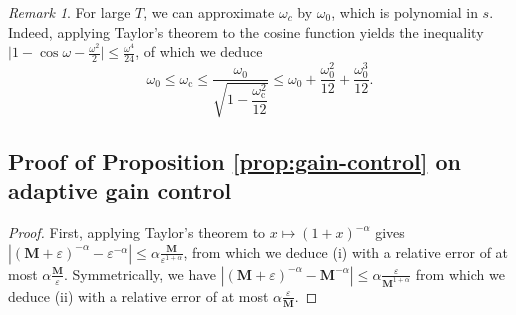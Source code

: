 \documentclass[journal]{IEEEtran}
\newtheorem*{prop*}{Proposition}
\theoremstyle{remark}
\newtheorem*{remark}{Remark}
\begin{document}
\begin{remark}
For large $T$, we can approximate $\omega_{c}$ by $\omega_0$, which is polynomial in $s$.
Indeed, applying Taylor's theorem to the cosine function yields the inequality $\vert 1 - \cos \omega - \frac{\omega^2}{2}\vert \leq \frac{\omega^4}{24}$, of which we deduce
\begin{equation}
\omega_0 \leq \omega_\mathrm{c} \leq \dfrac{\omega_0}{\sqrt{1 - \dfrac{\omega_\mathrm{c}^2}{12}}}
\leq \omega_0 + \dfrac{\omega_0^2}{12} + \dfrac{\omega_0^3}{12}.
\end{equation}
\end{remark}


\subsection{Proof of Proposition \ref{prop:gain-control} on adaptive gain control}


\begin{proof}
First, applying Taylor's theorem to $x \mapsto (1+x)^{-\alpha}$ gives $\left \vert (\mathbf{M} + \varepsilon)^{-\alpha} - \varepsilon^{-\alpha} \right \vert \leq \alpha \frac{\mathbf{M}}{\varepsilon^{1+\alpha}}$, from which we deduce (i) with a relative error of at most $\alpha \frac{\mathbf{M}}{\varepsilon}$.
Symmetrically, we have $\left \vert (\mathbf{M} + \varepsilon)^{-\alpha} - \mathbf{M}^{-\alpha} \right \vert \leq \alpha \frac{\varepsilon}{\mathbf{M}^{1+\alpha}}$ from which we deduce (ii) with a relative error of at most $\alpha \frac{\varepsilon}{\mathbf{M}}$.
\end{proof}
\end{document}
